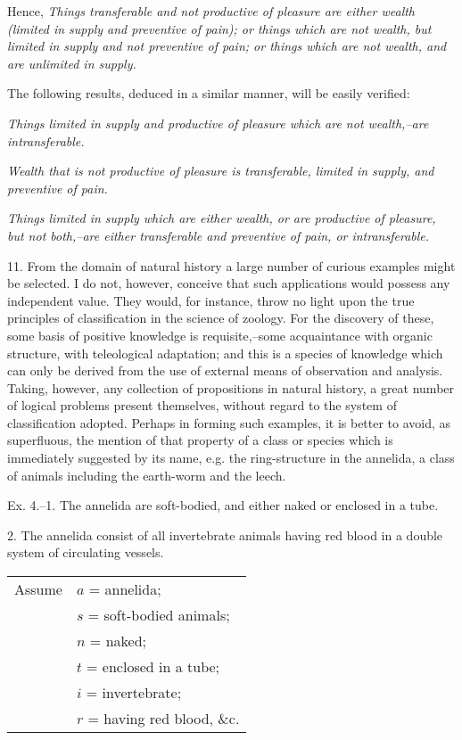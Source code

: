 \documentclass[oneside]{book}
\begin{document}
Hence, \textit{Things transferable and not productive of pleasure are
either wealth (limited in supply and preventive of pain); or things
which are not wealth, but limited in supply and not preventive of
pain; or things which are not wealth, and are unlimited in supply.}

The following results, deduced in a similar manner, will be
easily verified:

\textit{Things limited in supply and productive of pleasure which are
not wealth,--are intransferable.}

\textit{Wealth that is not productive of pleasure is transferable, limited
in supply, and preventive of pain.}

\textit{Things limited in supply which are either wealth, or are productive of pleasure, but not both,--are either transferable and
preventive of pain, or intransferable.}

11. From the domain of natural history a large number of
curious examples might be selected. I do not, however, conceive
that such applications would possess any independent value.
They would, for instance, throw no light upon the true
principles of classification in the science of zoology. For the
discovery of these, some basis of positive knowledge is requisite,--some
acquaintance with organic structure, with teleological adaptation;
and this is a species of knowledge which can only be derived
from the use of external means of observation and analysis.
Taking, however, any collection of propositions in natural history,
a great number of logical problems present themselves,
without regard to the system of classification adopted. Perhaps
in forming such examples, it is better to avoid, as superfluous,
the mention of that property of a class or species which is immediately
suggested by its name, e.g. the ring-structure in the
annelida, a class of animals including the earth-worm and the
leech.

Ex. 4.--1. The annelida are soft-bodied, and either naked or
enclosed in a tube.

2. The annelida consist of all invertebrate animals having
red blood in a double system of circulating vessels. \\

\begin{tabular}{c l}
\textrm{Assume }&$a$ = \textrm{annelida;} \\
       &$s$ = \textrm{soft-bodied animals;} \\
       &$n$ = \textrm{naked;} \\
       &$t$ = \textrm{enclosed in a tube;} \\
       &$i$ = \textrm{invertebrate;} \\
       &$r$ = \textrm{having red blood, \&c.}
\end{tabular}\\
\end{document}
